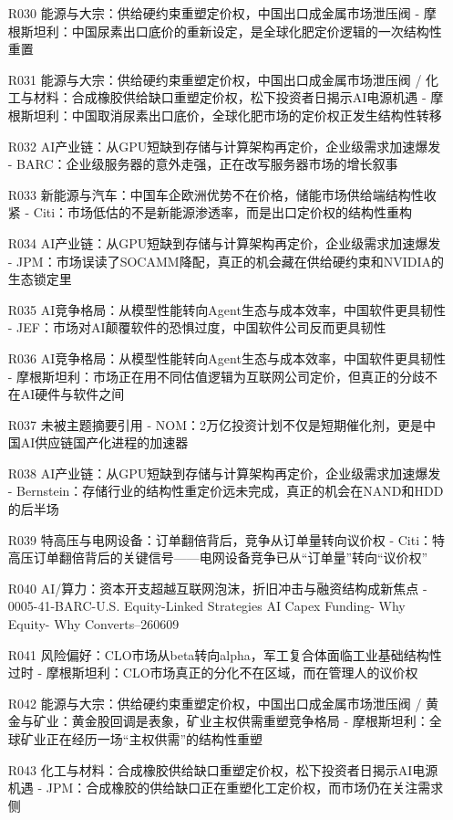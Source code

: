 \documentclass[11pt]{ctexart}
\begin{document}
\begin{itemize}
  \item [R030] 能源与大宗：供给硬约束重塑定价权，中国出口成金属市场泄压阀 - 摩根斯坦利：中国尿素出口底价的重新设定，是全球化肥定价逻辑的一次结构性重置
  \item [R031] 能源与大宗：供给硬约束重塑定价权，中国出口成金属市场泄压阀 / 化工与材料：合成橡胶供给缺口重塑定价权，松下投资者日揭示AI电源机遇 - 摩根斯坦利：中国取消尿素出口底价，全球化肥市场的定价权正发生结构性转移
  \item [R032] AI产业链：从GPU短缺到存储与计算架构再定价，企业级需求加速爆发 - BARC：企业级服务器的意外走强，正在改写服务器市场的增长叙事
  \item [R033] 新能源与汽车：中国车企欧洲优势不在价格，储能市场供给端结构性收紧 - Citi：市场低估的不是新能源渗透率，而是出口定价权的结构性重构
  \item [R034] AI产业链：从GPU短缺到存储与计算架构再定价，企业级需求加速爆发 - JPM：市场误读了SOCAMM降配，真正的机会藏在供给硬约束和NVIDIA的生态锁定里
  \item [R035] AI竞争格局：从模型性能转向Agent生态与成本效率，中国软件更具韧性 - JEF：市场对AI颠覆软件的恐惧过度，中国软件公司反而更具韧性
  \item [R036] AI竞争格局：从模型性能转向Agent生态与成本效率，中国软件更具韧性 - 摩根斯坦利：市场正在用不同估值逻辑为互联网公司定价，但真正的分歧不在AI硬件与软件之间
  \item [R037] 未被主题摘要引用 - NOM：2万亿投资计划不仅是短期催化剂，更是中国AI供应链国产化进程的加速器
  \item [R038] AI产业链：从GPU短缺到存储与计算架构再定价，企业级需求加速爆发 - Bernstein：存储行业的结构性重定价远未完成，真正的机会在NAND和HDD的后半场
  \item [R039] 特高压与电网设备：订单翻倍背后，竞争从订单量转向议价权 - Citi：特高压订单翻倍背后的关键信号——电网设备竞争已从“订单量”转向“议价权”
  \item [R040] AI/算力：资本开支超越互联网泡沫，折旧冲击与融资结构成新焦点 - 0005-41-BARC-U.S. Equity-Linked Strategies AI Capex Funding- Why Equity- Why Converts--260609
  \item [R041] 风险偏好：CLO市场从beta转向alpha，军工复合体面临工业基础结构性过时 - 摩根斯坦利：CLO市场真正的分化不在区域，而在管理人的议价权
  \item [R042] 能源与大宗：供给硬约束重塑定价权，中国出口成金属市场泄压阀 / 黄金与矿业：黄金股回调是表象，矿业主权供需重塑竞争格局 - 摩根斯坦利：全球矿业正在经历一场“主权供需”的结构性重塑
  \item [R043] 化工与材料：合成橡胶供给缺口重塑定价权，松下投资者日揭示AI电源机遇 - JPM：合成橡胶的供给缺口正在重塑化工定价权，而市场仍在关注需求侧

\end{itemize}
\end{document}
